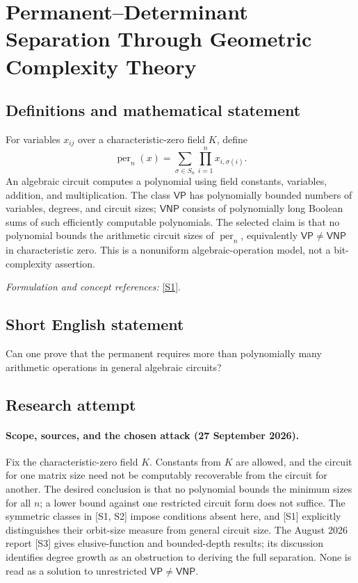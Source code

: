 \documentclass[11pt]{article}
\begin{document}
\section*{\texorpdfstring{Permanent–Determinant Separation Through Geometric Complexity Theory}{Permanent–Determinant Separation Through Geometric Complexity Theory}}\label{30001375}
\subsection{Definitions and mathematical statement}
For variables $x_{ij}$ over a characteristic-zero field $K$, define
\[
 \operatorname{per}_n(x)=\sum_{\sigma\in S_n}\prod_{i=1}^n x_{i,\sigma(i)}.
\]
An algebraic circuit computes a polynomial using field constants, variables, addition, and multiplication. The class $\mathsf{VP}$ has polynomially bounded numbers of variables, degrees, and circuit sizes; $\mathsf{VNP}$ consists of polynomially long Boolean sums of such efficiently computable polynomials. The selected claim is that no polynomial bounds the arithmetic circuit sizes of $\operatorname{per}_n$, equivalently $\mathsf{VP}\ne\mathsf{VNP}$ in characteristic zero. This is a nonuniform algebraic-operation model, not a bit-complexity assertion.
\par\smallskip\textit{Formulation and concept references:} \href{https://www.prateekdwivedi.in/papers/symACT-confversion.pdf}{[S1]}.

\subsection{Short English statement}
Can one prove that the permanent requires more than polynomially many arithmetic operations in general algebraic circuits?
\subsection{Research attempt}

\paragraph{Scope, sources, and the chosen attack (27 September 2026).}
Fix the characteristic-zero field $K$. Constants from $K$ are allowed,
and the circuit for one matrix size need not be computably recoverable
from the circuit for another. The desired conclusion is that no
polynomial bounds the minimum sizes for all $n$; a lower bound against
one restricted circuit form does not suffice.
The symmetric classes in [S1, S2] impose conditions absent here, and
[S1] explicitly distinguishes their orbit-size measure from general
circuit size. The August 2026 report [S3] gives elusive-function and
bounded-depth results; its discussion identifies degree growth as an
obstruction to deriving the full separation. None is read as a solution
to unrestricted $\mathsf{VP}\ne\mathsf{VNP}$.
\end{document}

